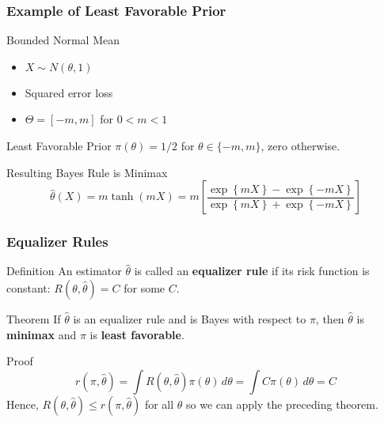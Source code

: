 \begin{frame}
  \frametitle{Example of Least Favorable Prior}

  \begin{block}{Bounded Normal Mean}
  \begin{itemize}
    \item $X \sim N(\theta,1)$
    \item Squared error loss
    \item $\Theta = [-m,m]$ for $0 < m < 1$
  \end{itemize}
\end{block}

\begin{block}{Least Favorable Prior}
  $\pi(\theta) = 1/2$ for $\theta \in\{-m,m\}$, zero otherwise. 
\end{block}

\begin{block}{Resulting Bayes Rule is Minimax}
  \vspace{-1em}
\[
  \widehat{\theta}(X) = m \tanh(mX) = m\left[ \frac{\exp\left\{ mX \right\} - \exp\left\{ -mX \right\}}{\exp\left\{ mX \right\} + \exp\left\{ -mX \right\}}\right]
\]
\end{block}

\end{frame}
\begin{frame}
  \frametitle{Equalizer Rules}
  \begin{block}{Definition}
    An estimator $\widehat{\theta}$ is called an \textbf{equalizer rule} if its risk function is constant: $R(\theta, \widehat{\theta}) = C$ for some $C$.
  \end{block}

  \begin{block}{Theorem}
    If $\widehat{\theta}$ is an equalizer rule and is Bayes with respect to $\pi$, then $\widehat{\theta}$ is \textbf{minimax} and $\pi$ is \textbf{least favorable}.
  \end{block}
  
  \begin{block}{Proof}
    \vspace{-2em}
    \[
      r(\pi, \widehat{\theta}) = \int R(\theta, \widehat{\theta})\pi(\theta)\, d\theta = \int C \pi(\theta) \, d\theta = C 
    \]
    Hence, $R(\theta, \widehat{\theta}) \leq r(\pi, \widehat{\theta})$ for all $\theta$ so we can apply the preceding theorem. 
  \end{block}

\end{frame}
